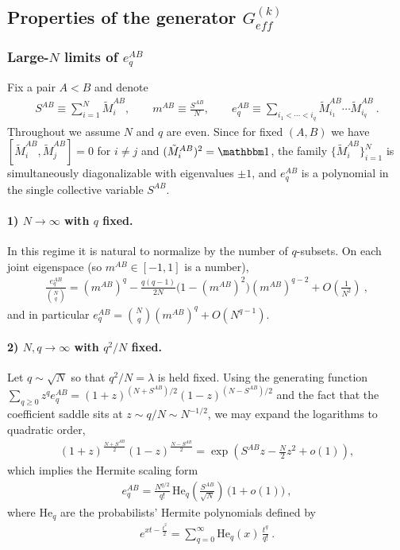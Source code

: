 \documentclass{article}
\theoremstyle{definition}
\begin{document}
    \subsection{Properties of the generator $G_{eff}^{(k)}$}
    \subsubsection{Large-$N$ limits of $e_{q}^{AB}$}
    Fix a pair $A<B$ and denote
    \begin{eqnarray}
        S^{AB}\equiv \sum_{i=1}^N \tilde M^{AB}_i,\qquad m^{AB}\equiv
        \frac{S^{AB}}{N},\qquad e_q^{AB}\equiv \sum_{i_1<\cdots<i_q}\tilde M^{AB}_{i_1}\cdots
        \tilde M^{AB}_{i_q}\ .
    \end{eqnarray}
    Throughout we assume $N$ and $q$ are even. Since for fixed $(A,B)$ we have
    $[ \tilde M^{AB}_{i},\tilde M^{AB}_{j}]=0$ for $i\neq j$ and
    $(\tilde M^{AB}_{i})^{2}=\mathbbm 1$, the family $\{\tilde M^{AB}_{i}\}_{i=1}
    ^{N}$ is simultaneously diagonalizable with eigenvalues $\pm 1$, and
    $e_{q}^{AB}$ is a polynomial in the single collective variable $S^{AB}$.

    \paragraph{1) $N\to\infty$ with $q$ fixed.}
    In this regime it is natural to normalize by the number of $q$-subsets. On
    each joint eigenspace (so $m^{AB}\in[-1,1]$ is a number),
    \begin{eqnarray}
        \label{eq:eq_largeN_fixedq} \frac{e_{q}^{AB}}{\binom{N}{q}} = (m^{AB})^q-\frac{q(q-1)}{2N}\big(1-(m^{AB})^2\big)(m^{AB})^{q-2}
        +O\!\left(\frac{1}{N^{2}}\right)\ ,
    \end{eqnarray}
    and in particular $e_{q}^{AB}=\binom{N}{q}(m^{AB})^{q}+O(N^{q-1})$.

    \paragraph{2) $N,q\to\infty$ with $q^{2}/N$ fixed.}
    Let $q\sim \sqrt{N}$ so that $q^{2}/N=\lambda$ is held fixed. Using the generating
    function $\sum_{q\ge 0}z^{q}e_{q}^{AB}=(1+z)^{(N+S^{AB})/2}(1-z)^{(N-S^{AB})/2}$
    and the fact that the coefficient saddle sits at $z\sim q/N\sim N^{-1/2}$,
    we may expand the logarithms to quadratic order,
    \begin{eqnarray}
        (1+z)^{\frac{N+S^{AB}}{2}}(1-z)^{\frac{N-S^{AB}}{2}} =\exp\!\left(S^{AB}z-\frac{N}{2}z^2+o(1)\right),
    \end{eqnarray}
    which implies the Hermite scaling form
    \begin{eqnarray}
        \label{eq:eq_hermite_scaling} e_q^{AB} =\frac{N^{q/2}}{q!}\, \mathrm{He}_q\!\left(\frac{S^{AB}}{\sqrt{N}}\right)\,\big(1+o(1)\big)\ ,
    \end{eqnarray}
    where $\mathrm{He}_{q}$ are the probabilists' Hermite polynomials defined by
    \begin{eqnarray}
        e^{xt-\frac{t^{2}}{2}}=\sum_{q=0}^\infty \mathrm{He}_q(x)\,\frac{t^{q}}{q!}\ .
    \end{eqnarray}
\end{document}

